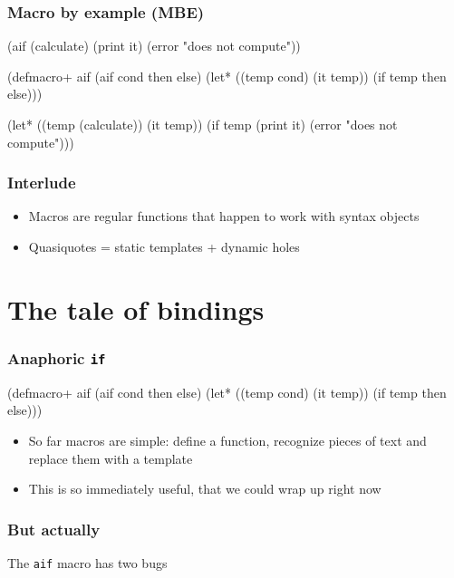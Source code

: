 \documentclass[hyperref={bookmarks=false}]{beamer}
\begin{document}
\begin{frame}[fragile]
\frametitle{Macro by example (MBE)}
\begin{semiverbatim}
(aif (calculate)
  (print it)
  (error "does not compute"))

(defmacro+ aif
  \alert{(aif cond then else)}
  (let* ((temp \alert{cond})
         (it temp))
    (if temp
        \alert{then}
        \alert{else})))

(let* ((temp (calculate))
       (it temp))
  (if temp
    (print it)
    (error "does not compute")))
\end{semiverbatim}
\end{frame}

\begin{frame}[fragile]
\frametitle{Interlude}
\begin{itemize}
\item Macros are regular functions that happen to work with syntax objects
\item Quasiquotes = static templates + dynamic holes
\end{itemize}
\end{frame}

\section{The tale of bindings}

\begin{frame}[fragile]
\frametitle{Anaphoric \texttt{if}}
\begin{semiverbatim}
(defmacro+ aif
  (aif cond then else)
  (let* ((temp cond)
         (it temp))
    (if temp then else)))
\end{semiverbatim}

\begin{itemize}
\item So far macros are simple: define a function, recognize pieces of text and replace them with a template
\item This is so immediately useful, that we could wrap up right now
\end{itemize}
\end{frame}

\begin{frame}[fragile]
\frametitle{But actually}
The \texttt{aif} macro has two bugs
\end{frame}
\end{document}

